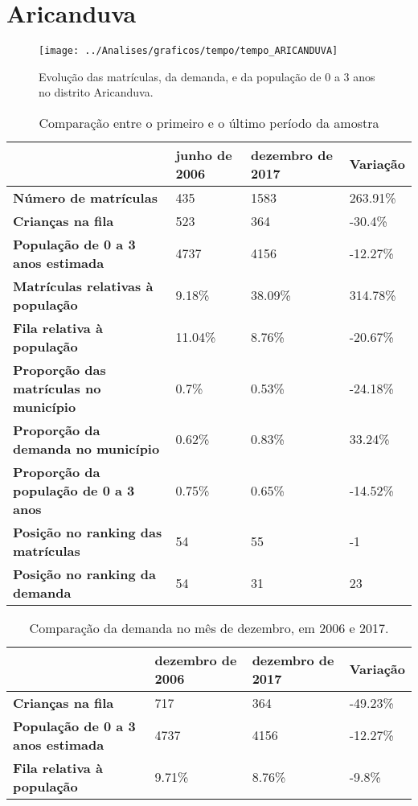 \section{Aricanduva}
\begin{figure}[H]
\centering
\texttt{[image: ../Analises/graficos/tempo/tempo\_ARICANDUVA]}
\caption{Evolução das matrículas, da demanda, e da população de 0 a 3 anos no distrito Aricanduva.}
\end{figure}
\begin{table}[H]
\begin{tabular}{|l|l|l|l|}
\hline
\textbf{}                                      & \textbf{junho de 2006}       & \textbf{dezembro de 2017}    & \textbf{Variação} \\ \hline
\textbf{Número de matrículas}                  & 435 & 1583 & 263.91\% \\ \hline
\textbf{Crianças na fila}                      & 523 & 364 & -30.4\% \\ \hline
\textbf{População de 0 a 3 anos estimada}      & 4737 & 4156 & -12.27\% \\ \hline
\textbf{Matrículas relativas à população}      & 9.18\% & 38.09\% & 314.78\% \\ \hline
\textbf{Fila relativa à população}             & 11.04\% & 8.76\% & -20.67\% \\ \hline
\textbf{Proporção das matrículas no município} & 0.7\% & 0.53\% & -24.18\% \\ \hline
\textbf{Proporção da demanda no município}     & 0.62\% & 0.83\% & 33.24\% \\ \hline
\textbf{Proporção da população de 0 a 3 anos}  & 0.75\% & 0.65\% & -14.52\% \\ \hline
\textbf{Posição no ranking das matrículas}     & 54 & 55 & -1 \\ \hline
\textbf{Posição no ranking da demanda}         & 54 & 31 & 23 \\ \hline
\end{tabular}
\caption{Comparação entre o primeiro e o último período da amostra}
\end{table}
\begin{table}[H]
\begin{tabular}{|l|l|l|l|}
\hline
\textbf{}                                 & \textbf{dezembro de 2006} & \textbf{dezembro de 2017} & \textbf{Variação} \\ \hline
\textbf{Crianças na fila}                      & 717 & 364 & -49.23\% \\ \hline
\textbf{População de 0 a 3 anos estimada}      & 4737 & 4156 & -12.27\% \\ \hline
\textbf{Fila relativa à população}             & 9.71\% & 8.76\% & -9.8\% \\ \hline
\end{tabular}
\caption{Comparação da demanda no mês de dezembro, em 2006 e 2017.}
\end{table}
